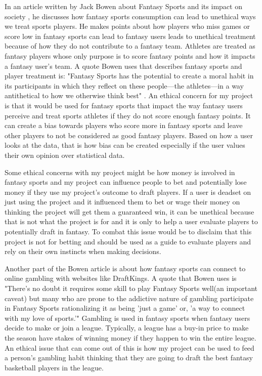 \documentclass[10pt,twocolumn]{article}
\begin{document}
In an article written by Jack Bowen about Fantasy Sports and its impact on society \cite{fantasyEthics}, he discusses how fantasy sports consumption can lead to unethical ways we treat sports players. He makes points about how players who miss games or score low in fantasy sports can lead to fantasy users leads to unethical treatment because of how they do not contribute to a fantasy team. Athletes are treated as fantasy players whose only purpose is to score fantasy points and how it impacts a fantasy user's team. A quote Bowen uses that describes fantasy sports and player treatment is: "Fantasy Sports has the potential to create a moral habit in its participants in which they reflect on these people—the athletes—in a way antithetical to how we otherwise think best" \cite{fantasyEthics}. An ethical concern for my project is that it would be used for fantasy sports that impact the way fantasy users perceive and treat sports athletes if they do not score enough fantasy points. It can create a bias towards players who score more in fantasy sports and leave other players to not be considered as good fantasy players. Based on how a user looks at the data, that is how bias can be created especially if the user values their own opinion over statistical data.

Some ethical concerns with my project might be how money is involved in fantasy sports and my project can influence people to bet and potentially lose money if they use my project's outcome to draft players. If a user is deadset on just using the project and it influenced them to bet or wage their money on thinking the project will get them a guaranteed win, it can be unethical because that is not what the project is for and it is only to help a user evaluate players to potentially draft in fantasy. To combat this issue would be to disclaim that this project is not for betting and should be used as a guide to evaluate players and rely on their own instincts when making decisions. 

Another part of the Bowen article is about how fantasy sports can connect to online gambling with websites like DraftKings. A quote that Bowen uses is "There’s no doubt it requires some skill to play Fantasy Sports well(an important caveat) but many who are prone to the addictive nature of gambling participate in Fantasy Sports rationalizing it as being 'just a game' or, 'a way to connect with my love of sports.'"\cite{fantasyEthics} Gambling is used in fantasy sports when fantasy users decide to make or join a league. Typically, a league has a buy-in price to make the season have stakes of winning money if they happen to win the entire league. An ethical issue that can come out of this is how my project can be used to feed a person's gambling habit thinking that they are going to draft the best fantasy basketball players in the league. 
\end{document}
